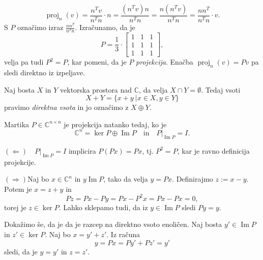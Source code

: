 \documentclass[mat1]{fmfdelo}
\newcommand{\C}{\mathbb C}
\DeclareMathOperator{\Ima}{Im}
\begin{document}
\begin{zgled}
\begin{equation}
        \operatorname{proj}_{n}(v) = \frac{n^T  v}{n^T n}\cdot n = \frac{(n^T  v)n}{n^T n} = \frac{n(n^T  v)}{n^T n} = \frac{n  n^T}{n^T n}\cdot v.
    \end{equation}
    S $P$ označimo izraz $\frac{n  n^T}{n^T n}$. Izračunamo, da je
    \begin{equation}
        P = \frac{1}{3}\cdot
        \begin{bmatrix}
            1 & 1 & 1 \\
            1 & 1 & 1 \\
            1 & 1 & 1
        \end{bmatrix},
    \end{equation}
    velja pa tudi $P^2 = P$, kar pomeni, da je $P$ \emph{projekcija}. Enačba $\operatorname{proj}_n (v) = P v$ pa sledi direktno iz izpeljave.
\end{zgled}
\begin{definicija}
    Naj bosta $X$ in $Y$ vektorska prostora nad $\C$, da velja $X \cap Y = \emptyset$. Tedaj vsoti
    \begin{equation}
        X + Y = \{x+y \ | x\in X, y\in Y\}
    \end{equation}
    pravimo \emph{direktna vsota} in jo označimo z $X \oplus Y$.
\end{definicija}
\begin{trditev}
    Martika $P \in \C^{n \times n}$ je projekcija natanko tedaj, ko je
    \begin{equation}
        \C^n = \ker P \oplus \Ima P\quad  \text{in}\quad P|_{\Ima P} = I.
    \end{equation}
\end{trditev}
\begin{dokaz}
    $(\Leftarrow)$$\quad P|_{\Ima P} = I$ implicira $P(P x) = P x$, tj. $P^2 = P$, kar je ravno definicija projekcije.

    $(\Rightarrow)$Naj bo $x \in \C^n$ in $y \Ima P$, tako da velja $y = P x$. Definirajmo $z := x-y$. Potem je $x = z + y$ in
    \begin{equation}
        P z = P x - P y = P x - P^2 x = P x - P x = 0,
    \end{equation}
    torej je $z \in \ker P$. Lahko sklepamo tudi, da iz $y \in \Ima P$ sledi $P y = y$.

    Dokažimo še, da je da je razcep na direktno vsoto enoličen. Naj bosta $y' \in \Ima P$ in $z' \in \ker P$. Naj bo $x = y' + z'$. Iz računa
    \begin{equation}
        y = P x = P y' + P z' = y'
    \end{equation}
    sledi, da je $y = y'$ in $z = z'$.
\end{dokaz}
\end{document}
